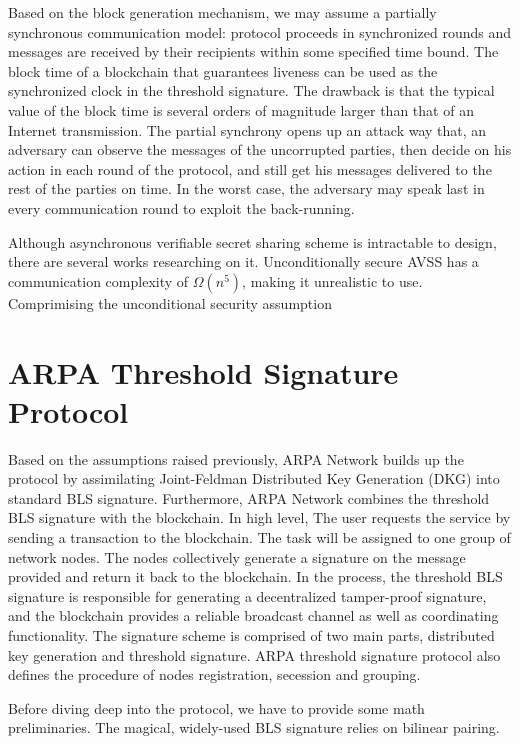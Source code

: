 \documentclass[11pt]{article}
\begin{document}
Based on the block generation mechanism, we may assume a partially synchronous communication model: protocol proceeds in synchronized rounds and messages are received by their recipients within some specified time bound. The block time of a blockchain that guarantees liveness can be used as the synchronized clock in the threshold signature. The drawback is that the typical value of the block time is several orders of magnitude larger than that of an Internet transmission. The partial synchrony opens up an attack way that, an adversary can observe the messages of the uncorrupted parties, then decide on his action in each round of the protocol, and still get his messages delivered to the rest of the parties on time. In the worst case, the adversary may speak last in every communication round to exploit the back-running\cite{gennaro2007secure}.

Although asynchronous verifiable secret sharing scheme is intractable to design, there are several works researching on it. Unconditionally secure AVSS has a communication complexity of $\Omega(n^5)$, making it unrealistic to use. Comprimising the unconditional security assumption 

\section{ARPA Threshold Signature Protocol}

Based on the assumptions raised previously, ARPA Network builds up the protocol by assimilating Joint-Feldman Distributed Key Generation (DKG)\cite{pedersen1991non} into standard BLS signature\cite{irtf-cfrg-bls-signature-05}. Furthermore, ARPA Network combines the threshold BLS signature with the blockchain. In high level, The user requests the service by sending a transaction to the blockchain. The task will be assigned to one group of network nodes. The nodes collectively generate a signature on the message provided and return it back to the blockchain. In the process, the threshold BLS signature is responsible for generating a decentralized tamper-proof signature, and the blockchain provides a reliable broadcast channel as well as coordinating functionality. The signature scheme is comprised of two main parts, distributed key generation and threshold signature. ARPA threshold signature protocol also defines the procedure of nodes registration, secession and grouping.

Before diving deep into the protocol, we have to provide some math preliminaries. The magical, widely-used BLS signature relies on bilinear pairing. 
\end{document}
